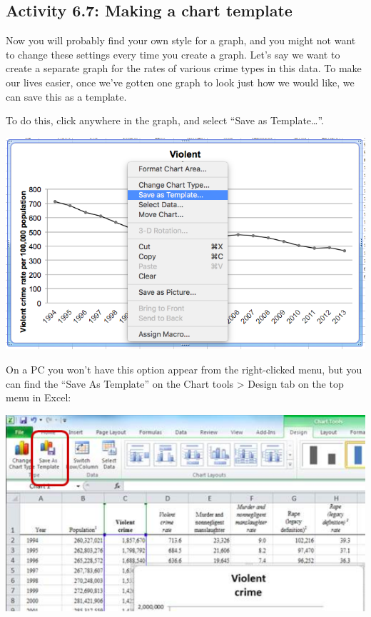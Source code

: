 \documentclass[
]{book}
\begin{document}
\hypertarget{activity-6.7-making-a-chart-template}{%
\subsection{Activity 6.7: Making a chart template}\label{activity-6.7-making-a-chart-template}}

Now you will probably find your own style for a graph, and you might not want to change these settings every time you create a graph. Let's say we want to create a separate graph for the rates of various crime types in this data. To make our lives easier, once we've gotten one graph to look just how we would like, we can save this as a template.

To do this, click anywhere in the graph, and select ``Save as Template\ldots{}''.

\includegraphics{imgs/save_as_template.png}

On a PC you won't have this option appear from the right-clicked menu, but you can find the ``Save As Template'' on the Chart tools \textgreater{} Design tab on the top menu in Excel:

\includegraphics{imgs/pc_save_template.png}
\end{document}
